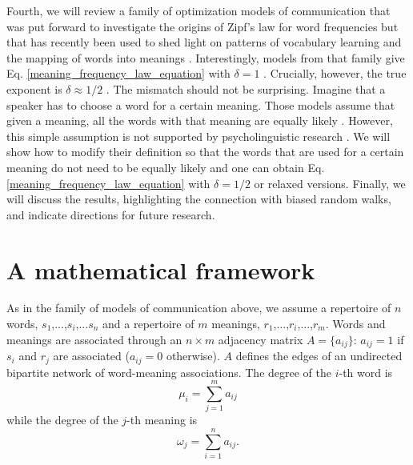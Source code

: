 \documentclass{article}
\begin{document}
Fourth, we will review 
a family of optimization models of communication that was put forward to investigate the origins of Zipf's law for word frequencies  \cite{Ferrer2007a} but that has recently been used to shed light on patterns of vocabulary learning and the mapping of words into meanings \cite{Ferrer2013g}. Interestingly, models from that family give Eq. 
\ref{meaning_frequency_law_equation} with $\delta = 1$ \cite{Ferrer2014d}. Crucially, however, the true exponent is $\delta \approx 1/2$ \cite{Zipf1945a,Ilgen2007a}. The mismatch should not be surprising. Imagine that a speaker has to choose a word for a certain meaning. Those models assume that given a meaning, all the words with that meaning are equally likely \cite{Ferrer2007a}. However, this simple assumption is not supported by psycholinguistic research \cite{Snodgrass1980a}. 
We will show
how to modify their definition so that the words that are used for a certain meaning do not need to be equally likely and one can obtain Eq. \ref{meaning_frequency_law_equation} with $\delta = 1/2$ or relaxed versions.  
Finally, we will discuss the results, highlighting the connection with biased random walks, and indicate 
directions for future research.

\section*{A mathematical framework}

As in the family of models of communication above, we assume a repertoire of $n$ words, $s_1$,...,$s_i$,...$s_n$ and a repertoire of $m$ meanings, $r_1$,...,$r_i$,...,$r_m$. Words and meanings are associated through an $n \times m$ adjacency matrix $A = \{a_{ij}\}$: $a_{ij} = 1$ if $s_i$ and $r_j$ are associated ($a_{ij} = 0$ otherwise). $A$ defines the edges of an undirected bipartite network of word-meaning associations. The degree of the $i$-th word is
\begin{equation}
\mu_i = \sum_{j=1}^m a_{ij} 	
\label{word_degree_equation}
\end{equation}
while the degree of the $j$-th meaning is
\begin{equation}
\omega_j = \sum_{i=1}^n a_{ij}. 
\label{meaning_degree_equation}
\end{equation}
\end{document}
